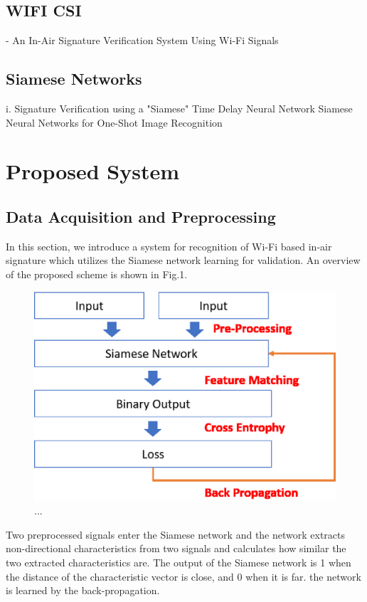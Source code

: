 \documentclass[runningheads]{llncs}
\begin{document}
\subsection{WIFI CSI}
- An In-Air Signature Verification System Using Wi-Fi Signals 
\subsection{Siamese Networks}
i. Signature Verification using a "Siamese" Time Delay Neural Network
Siamese Neural Networks for One-Shot Image Recognition

\section{Proposed System}
\subsection{Data Acquisition and Preprocessing}
In this section, we introduce a system for recognition of Wi-Fi based in-air signature which utilizes the Siamese network learning for validation.
An overview of the proposed scheme is shown in Fig.1.
\begin{figure}
\includegraphics[width=\textwidth]{methods1.eps}
\caption{...} \label{method1}
\end{figure}

 Two preprocessed signals enter the Siamese network and the network 
extracts non-directional characteristics from two signals and calculates how similar the two extracted characteristics are.
 The output of the Siamese network is 1 when the distance of the characteristic vector is close, and 0 when it is far.
the network is learned by the back-propagation.
\end{document}
